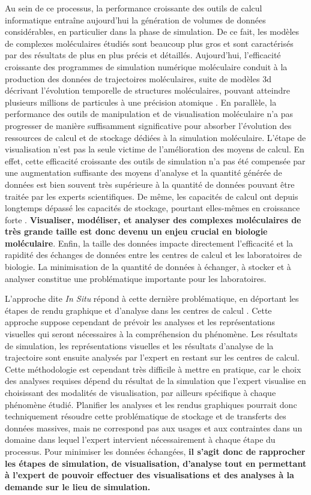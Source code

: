 Au sein de ce processus, la performance croissante des outils de calcul informatique entraîne aujourd'hui la génération de volumes de données considérables, en particulier dans la phase de simulation. De ce fait, les modèles de complexes moléculaires étudiés sont beaucoup plus gros et sont caractérisés par des résultats de plus en plus précis et détaillés. Aujourd'hui, l'efficacité croissante des programmes de simulation numérique moléculaire conduit à la production des données de trajectoires moléculaires, suite de modèles 3d décrivant l'évolution temporelle de structures moléculaires, pouvant atteindre plusieurs millions de particules à une précision atomique \cite{sanbonmatsu2013molecular}. En parallèle, la performance des outils de manipulation et de visualisation moléculaire n'a pas progresser de manière suffisamment significative pour absorber l'évolution des ressources de calcul et de stockage dédiées à la simulation moléculaire. L'étape de visualisation n'est pas la seule victime de l'amélioration des moyens de calcul. En effet, cette efficacité croissante des outils de simulation n'a pas été compensée par une augmentation suffisante des moyens d'analyse et la quantité générée de données est bien souvent très supérieure à la quantité de données pouvant être traitée par les experts scientifiques. De même, les capacités de calcul ont depuis longtemps dépassé les capacités de stockage, pourtant elles-mêmes en croissance forte  \cite{zimmerman2014data}. \textbf{Visualiser, modéliser, et analyser des complexes moléculaires de très grande taille est donc devenu un enjeu crucial en biologie moléculaire}. Enfin, la taille des données impacte directement l'efficacité et la rapidité des échanges de données entre les centres de calcul et les laboratoires de biologie. La minimisation de la quantité de données à échanger, à stocker et à analyser constitue une problématique importante pour les laboratoires.

L'approche dite \textit{In Situ} répond à cette dernière problématique, en déportant les étapes de rendu graphique et d'analyse dans les centres de calcul \cite{kuhlen2011parallel,ma2009situ}. Cette approche suppose cependant de prévoir les analyses et les représentations visuelles qui seront nécessaires à la compréhension du phénomène. Les résultats de simulation, les représentations visuelles et les résultats d'analyse de la trajectoire sont ensuite analysés par l'expert en restant sur les centres de calcul. Cette méthodologie est cependant très difficile à mettre en pratique, car le choix des analyses requises dépend du résultat de la simulation que l'expert visualise en choisissant des modalités de visualisation, par ailleurs spécifique à chaque phénomène étudié. Planifier les analyses et les rendus graphiques pourrait donc techniquement résoudre cette problématique de stockage et de transferts des données massives, mais ne correspond pas aux usages et aux contraintes dans un domaine dans lequel l'expert intervient nécessairement à chaque étape du processus. Pour minimiser les données échangées, \textbf{il s'agit donc de rapprocher les étapes de simulation, de visualisation, d'analyse tout en permettant à l'expert de pouvoir effectuer des visualisations et des analyses à la demande sur le lieu de simulation.}

